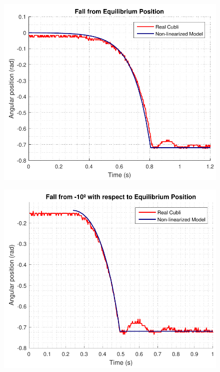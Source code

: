 \begin{minipage}{\linewidth}
	\begin{minipage}{0.5\linewidth}
		\begin{figure}[H]
			\includegraphics[scale=.55]{figures/FallTestComparison}
			\centering
			\captionsetup{justification=centering}
			\label{FallTestComparison}
		\end{figure}%
	\end{minipage}
	\begin{minipage}{0.5\linewidth}
		\begin{figure}[H]%
			\includegraphics[scale=.55]{figures/FallTestComparison10deg}

\end{figure}
\end{minipage}
\end{minipage}

